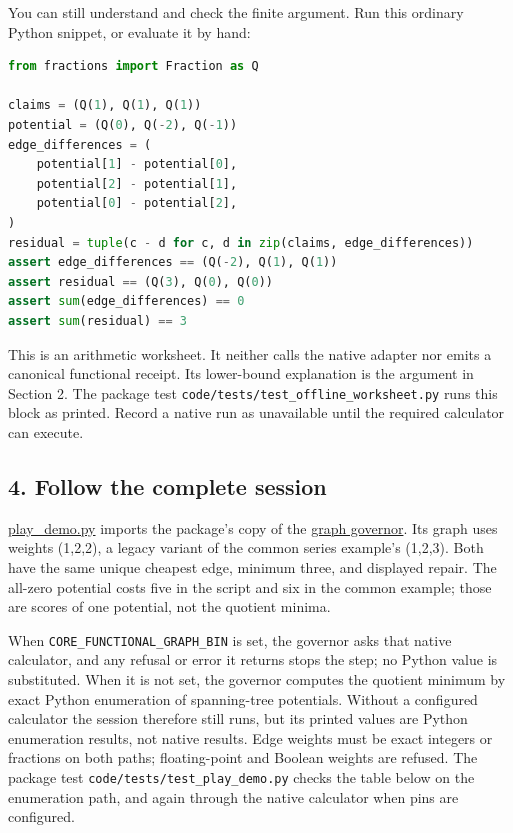 \documentclass[
  11pt,
]{article}
\begin{document}
You can still understand and check the finite argument. Run this
ordinary Python snippet, or evaluate it by hand:

\begin{lstlisting}[language=Python]
from fractions import Fraction as Q

claims = (Q(1), Q(1), Q(1))
potential = (Q(0), Q(-2), Q(-1))
edge_differences = (
    potential[1] - potential[0],
    potential[2] - potential[1],
    potential[0] - potential[2],
)
residual = tuple(c - d for c, d in zip(claims, edge_differences))
assert edge_differences == (Q(-2), Q(1), Q(1))
assert residual == (Q(3), Q(0), Q(0))
assert sum(edge_differences) == 0
assert sum(residual) == 3
\end{lstlisting}

This is an arithmetic worksheet. It neither calls the native adapter nor
emits a canonical functional receipt. Its lower-bound explanation is the
argument in Section 2. The package test
\nolinkurl{code/tests/test_offline_worksheet.py} runs this block as
printed. Record a native run as unavailable until the required
calculator can execute.

\subsection{4. Follow the complete
session}\label{follow-the-complete-session}

\href{https://github.com/dbccpage/the_symbol_game/blob/52cb5457f6c485ba548cfd292f6012a941ed22cf/atlas/coda_atlas/symbol_game/005_pfp_practitioners_field_manual/code/play_demo.py}{play\_demo.py}
imports the package's copy of the
\href{https://github.com/dbccpage/the_symbol_game/blob/52cb5457f6c485ba548cfd292f6012a941ed22cf/atlas/coda_atlas/symbol_game/005_pfp_practitioners_field_manual/code/l1_symbol_game_governor.py}{graph
governor}. Its graph uses weights (1,2,2), a legacy variant of the
common series example's (1,2,3). Both have the same unique cheapest
edge, minimum three, and displayed repair. The all-zero potential costs
five in the script and six in the common example; those are scores of
one potential, not the quotient minima.

When \nolinkurl{CORE_FUNCTIONAL_GRAPH_BIN} is set, the governor asks
that native calculator, and any refusal or error it returns stops the
step; no Python value is substituted. When it is not set, the governor
computes the quotient minimum by exact Python enumeration of
spanning-tree potentials. Without a configured calculator the session
therefore still runs, but its printed values are Python enumeration
results, not native results. Edge weights must be exact integers or
fractions on both paths; floating-point and Boolean weights are refused.
The package test \nolinkurl{code/tests/test_play_demo.py} checks the
table below on the enumeration path, and again through the native
calculator when pins are configured.
\end{document}
